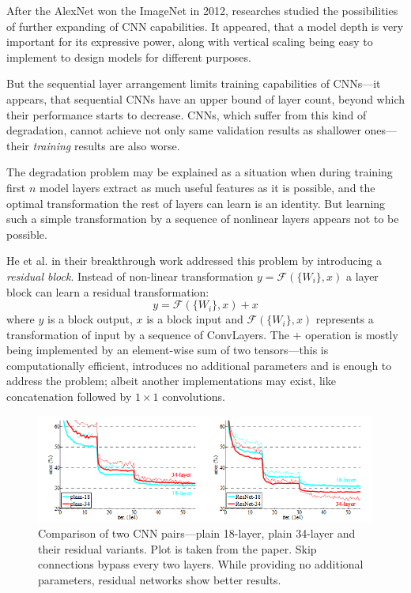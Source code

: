 \documentclass[thesis=B,english]{FITthesis}[2019/12/23]
\begin{document}
After the AlexNet\cite{alexnet} won the ImageNet in 2012, researches studied the possibilities of further expanding of CNN capabilities. It appeared, that a model depth is very important\cite{vgg}\cite{going_deeper} for its expressive power, along with vertical scaling being easy to implement to design models for different purposes.

But the sequential layer arrangement limits training capabilities of CNNs---it appears, that sequential CNNs have an upper bound of layer count, beyond which their performance starts to decrease. CNNs, which suffer from this kind of degradation, cannot achieve not only same validation results as shallower ones---their \textit{training} results are also worse.

The degradation problem may be explained as a situation when during training first $n$ model layers extract as much useful features as it is possible, and the optimal transformation the rest of layers can learn is an identity. But learning such a simple transformation by a sequence of nonlinear layers appears not to be possible.

He et al. in their breakthrough work\cite{resnet} addressed this problem by introducing a \textit{residual block}. Instead of non-linear transformation $y = \mathcal{F}(\{W_i\}, x)$ a layer block can learn a residual transformation:
\[y = \mathcal{F}(\{W_i\}, x) + x\]
where $y$ is a block output, $x$ is a block input and $\mathcal{F}(\{W_i\}, x)$ represents a transformation of input by a sequence of ConvLayers. The $+$ operation is mostly being implemented by an element-wise sum of two tensors---this is computationally efficient, introduces no additional parameters and is enough to address the problem; albeit another implementations may exist, like concatenation followed by $1 \times 1$ convolutions.

\begin{figure}[h]
	\centering
	\includegraphics[width=\textwidth]{images/residual_results.png}
	\caption{Comparison of two CNN pairs---plain 18-layer, plain 34-layer and their residual variants. Plot is taken from the paper\cite{resnet}. Skip connections bypass every two layers. While providing no additional parameters, residual networks show better results.}
\end{figure}
\end{document}
